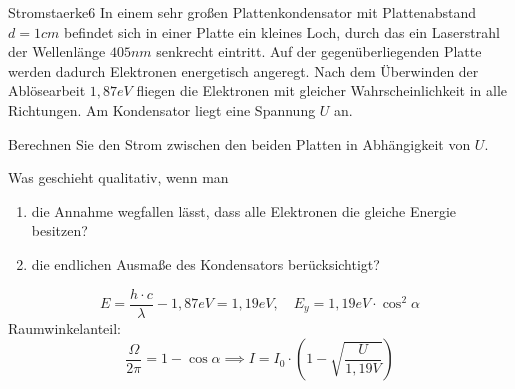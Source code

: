 \begin{problem}{Stromstaerke}{6}
In einem sehr großen Plattenkondensator mit Plattenabstand $d=1\unit{cm}$ befindet sich in einer Platte ein kleines Loch, durch das ein Laserstrahl der Wellenlänge $405\unit{nm}$ senkrecht eintritt. Auf der gegenüberliegenden Platte werden dadurch Elektronen energetisch angeregt. Nach dem Überwinden der Ablösearbeit $1,87\unit{eV}$ fliegen die Elektronen mit gleicher Wahrscheinlichkeit in alle Richtungen. Am Kondensator liegt eine Spannung $U$ an.
\begin{abcenum}
  \item Berechnen Sie den Strom zwischen den beiden Platten in Abhängigkeit von $U$.
  \item Was geschieht qualitativ, wenn man
  \begin{enumerate}
    \item die Annahme wegfallen lässt, dass alle Elektronen die gleiche Energie besitzen?
    \item die endlichen Ausmaße des Kondensators berücksichtigt?
  \end{enumerate}
\end{abcenum}
\begin{solution}
\[
E=\frac{h\cdot c}{\lambda}-1,87\unit{eV}=1,19\unit{eV}, \quad E_y=1,19\unit{eV}\cdot \cos^2\alpha
\]
Raumwinkelanteil:
\[
\frac{\Omega}{2\pi} = 1-\cos{\alpha} \implies I=I_0\cdot\left(1-\sqrt{\frac{U}{1,19\unit{V}}}\right)
\]
\end{solution}
\end{problem}



